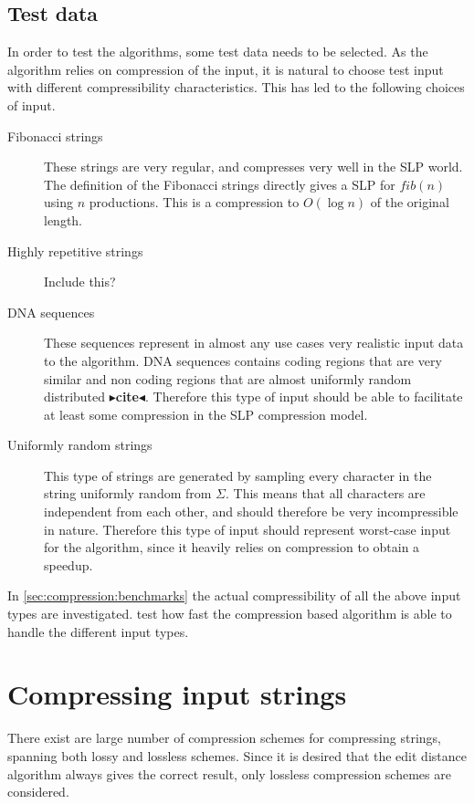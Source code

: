 \documentclass[twoside,11pt,openright]{report}
\newcommand{\todo}[1]{{\color[rgb]{.5,0,0}\textbf{$\blacktriangleright$#1$\blacktriangleleft$}}}
\begin{document}
\section{Test data}
\label{sec:intro:test-data}
In order to test the algorithms, some test data needs to be selected. As the algorithm relies on compression of the input, it is natural to choose test input with different compressibility characteristics. This has led to the following choices of input.
\begin{description}
  \item[Fibonacci strings] These strings are very regular, and compresses very well in the SLP world. The definition of the Fibonacci strings directly gives a SLP for $fib(n)$ using $n$ productions. This is a compression to $O(\log{n})$ of the original length.
  \item[Highly repetitive strings] Include this?
  \item[DNA sequences] These sequences represent in almost any use cases very realistic input data to the algorithm. DNA sequences contains coding regions that are very similar and non coding regions that are almost uniformly random distributed \todo{cite}. Therefore this type of input should be able to facilitate at least some compression in the SLP compression model.
  \item[Uniformly random strings] This type of strings are generated by sampling every character in the string uniformly random from $\Sigma$. This means that all characters are independent from each other, and should therefore be very incompressible in nature. Therefore this type of input should represent worst-case input for the algorithm, since it heavily relies on compression to obtain a speedup.
\end{description}
In \cref{sec:compression:benchmarks} the actual compressibility of all the above input types are investigated.  test how fast the compression based algorithm is able to handle the different input types.

\chapter{Compressing input strings}
\label{ch:compressing-strings}
There exist are large number of compression schemes for compressing strings, spanning both lossy and lossless schemes. Since it is desired that the edit distance algorithm always gives the correct result, only lossless compression schemes are considered.
\end{document}
